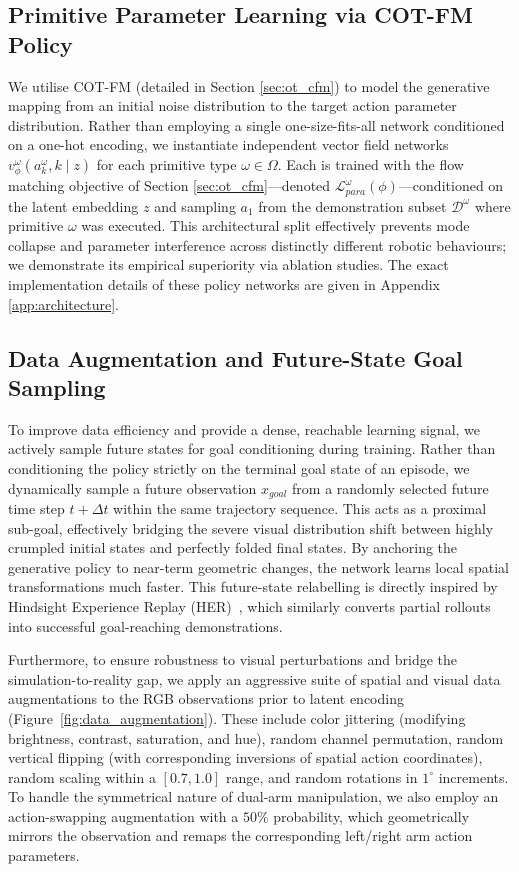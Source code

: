 \documentclass[journal]{IEEEtran}
\begin{document}
\subsection{Primitive Parameter Learning via COT-FM Policy}
\label{sec:cot_fm_learning}

We utilise COT-FM \cite{black2024pi0, lipman2022flow} (detailed in Section \ref{sec:ot_cfm}) to model the generative mapping from an initial noise distribution to the target action parameter distribution. Rather than employing a single one-size-fits-all network conditioned on a one-hot encoding, we instantiate independent vector field networks $v_{\phi}^{\omega}(a_k^\omega, k \mid z)$ for each primitive type $\omega \in \Omega$. Each is trained with the flow matching objective of Section \ref{sec:ot_cfm}---denoted $\mathcal{L}_{para}^{\omega}(\phi)$---conditioned on the latent embedding $z$ and sampling $a_1$ from the demonstration subset $\mathcal{D}^\omega$ where primitive $\omega$ was executed. This architectural split effectively prevents mode collapse and parameter interference across distinctly different robotic behaviours; we demonstrate its empirical superiority via ablation studies. The exact implementation details of these policy networks are given in Appendix \ref{app:architecture}.

\subsection{Data Augmentation and Future-State Goal Sampling}
\label{sec:data_aug}
To improve data efficiency and provide a dense, reachable learning signal, we actively sample future states for goal conditioning during training. Rather than conditioning the policy strictly on the terminal goal state of an episode, we dynamically sample a future observation $x_{goal}$ from a randomly selected future time step $t + \Delta t$ within the same trajectory sequence. This acts as a proximal sub-goal, effectively bridging the severe visual distribution shift between highly crumpled initial states and perfectly folded final states. By anchoring the generative policy to near-term geometric changes, the network learns local spatial transformations much faster. This future-state relabelling is directly inspired by Hindsight Experience Replay (HER)~\cite{andrychowicz2017hindsight}, which similarly converts partial rollouts into successful goal-reaching demonstrations.

Furthermore, to ensure robustness to visual perturbations and bridge the simulation-to-reality gap, we apply an aggressive suite of spatial and visual data augmentations to the RGB observations prior to latent encoding (Figure~\ref{fig:data_augmentation}). These include color jittering (modifying brightness, contrast, saturation, and hue), random channel permutation, random vertical flipping (with corresponding inversions of spatial action coordinates), random scaling within a $[0.7, 1.0]$ range, and random rotations in $1^\circ$ increments. To handle the symmetrical nature of dual-arm manipulation, we also employ an action-swapping augmentation with a $50\%$ probability, which geometrically mirrors the observation and remaps the corresponding left/right arm action parameters.
\end{document}
